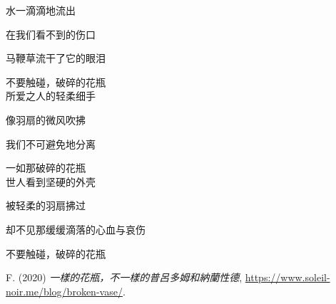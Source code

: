 \begin{multicols}{2}
水一滴滴地流出            \par
在我们看不到的伤口         \par
马鞭草流干了它的眼泪       \par
不要触碰，破碎的花瓶       \\

所爱之人的轻柔细手         \par
像羽扇的微风吹拂           \par
我们不可避免地分离         \par
一如那破碎的花瓶           \\

世人看到坚硬的外壳         \par
被轻柔的羽扇拂过           \par
却不见那缓缓滴落的心血与哀伤 \par
不要触碰，破碎的花瓶
\end{multicols}

\begin{thebibliography}{9}
F. (2020) \emph{一樣的花瓶，不一樣的普呂多姆和納蘭性德}, \url{https://www.soleil-noir.me/blog/broken-vase/}.
\end{thebibliography}
